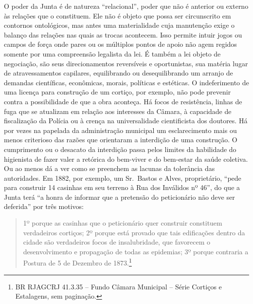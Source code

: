 O poder da Junta é de natureza ``relacional'', poder que não é anterior
ou externo às relações que o constituem. Ele não é objeto que possa ser
circunscrito em contornos ontológicos, mas antes uma materialidade cuja
manutenção exige o balanço das relações nas quais as trocas acontecem.
Isso permite intuir jogos ou campos de força onde pares ou os múltiplos
pontos de apoio não agem regidos somente por uma compreensão legalista
da lei. É também a lei objeto de negociação, são seus direcionamentos
reversíveis e oportunistas, sua matéria lugar de atravessamentos
capilares, equilibrando ou desequilibrando um arranjo de demandas
científicas, econômicas, morais, políticas e estéticas. O indeferimento
de uma licença para construção de um cortiço, por exemplo, não pode
prevenir contra a possibilidade de que a obra aconteça. Há focos de
resistência, linhas de fuga que se atualizam em relação aos interesses
da Câmara, à capacidade de fiscalização da Polícia ou à crença na
universalidade cientificista dos doutores. Há por vezes na papelada da
administração municipal um esclarecimento mais ou menos criterioso das
razões que orientaram a interdição de uma construção. O cumprimento ou o
desacato da interdição passa pelos limites da habilidade do higienista
de fazer valer a retórica do bem-viver e do bem-estar da saúde coletiva.
Ou ao menos dá a ver como se preenchem as lacunas da tolerância das
autoridades. Em 1882, por exemplo, um Sr.~Bastos e Alves, proprietário,
``pede para construir 14 casinhas em seu terreno à Rua dos Inválidos nº
46'', do que a Junta terá ``a honra de informar que a pretensão do
peticionário não deve ser deferida'' por três motivos:

\begin{quote}
1º porque as casinhas que o peticionário quer construir constituem
verdadeiros cortiços; 2º porque está provado que tais edificações dentro
da cidade são verdadeiros focos de insalubridade, que favorecem o
desenvolvimento e propagação de todas as epidemias; 3º porque contraria
a Postura de 5 de Dezembro de 1873.\footnote{BR RJAGCRJ 41.3.35 -- Fundo
  Câmara Municipal -- Série Cortiços e Estalagens, sem paginação.}
\end{quote}

